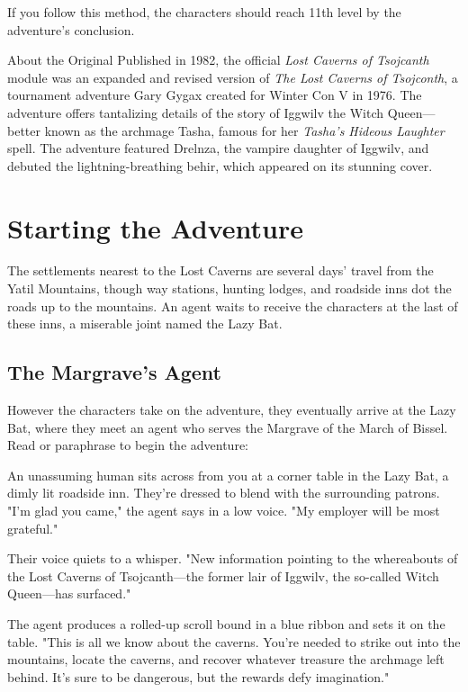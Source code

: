 \documentclass[10pt,a4paper,twoside,bg=print,twocolumn,openany,nodeprecatedcode]{dndbook}
\begin{document}
If you follow this method, the characters should reach 11th level by the adventure's conclusion.

\begin{DndReadAloud}{About the Original}
Published in 1982, the official \textit{Lost Caverns of Tsojcanth} module was an expanded and revised version of \textit{The Lost Caverns of Tsojconth}, a tournament adventure Gary Gygax created for Winter Con V in 1976. The adventure offers tantalizing details of the story of Iggwilv the Witch Queen—better known as the archmage Tasha, famous for her \textit{Tasha's Hideous Laughter} spell. The adventure featured Drelnza, the vampire daughter of Iggwilv, and debuted the lightning-breathing behir, which appeared on its stunning cover.

\end{DndReadAloud}

\section{Starting the Adventure}
The settlements nearest to the Lost Caverns are several days' travel from the Yatil Mountains, though way stations, hunting lodges, and roadside inns dot the roads up to the mountains. An agent waits to receive the characters at the last of these inns, a miserable joint named the Lazy Bat.

\subsection{The Margrave's Agent}
However the characters take on the adventure, they eventually arrive at the Lazy Bat, where they meet an agent who serves the Margrave of the March of Bissel. Read or paraphrase to begin the adventure:

\begin{DndReadAloud}{}
An unassuming human sits across from you at a corner table in the Lazy Bat, a dimly lit roadside inn. They're dressed to blend with the surrounding patrons. "I'm glad you came," the agent says in a low voice. "My employer will be most grateful."

Their voice quiets to a whisper. "New information pointing to the whereabouts of the Lost Caverns of Tsojcanth—the former lair of Iggwilv, the so-called Witch Queen—has surfaced."

The agent produces a rolled-up scroll bound in a blue ribbon and sets it on the table. "This is all we know about the caverns. You're needed to strike out into the mountains, locate the caverns, and recover whatever treasure the archmage left behind. It's sure to be dangerous, but the rewards defy imagination."

\end{DndReadAloud}
\end{document}
